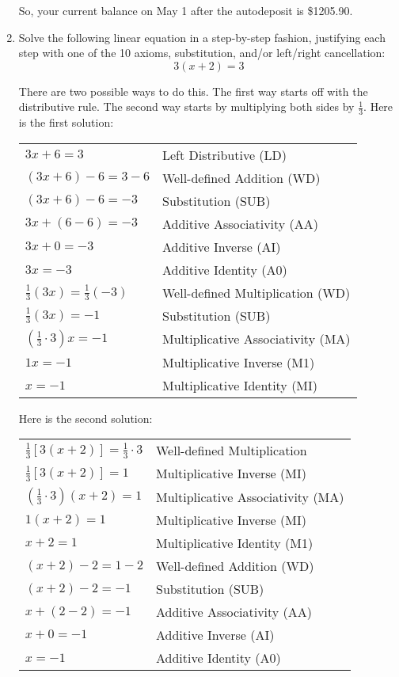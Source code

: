\documentclass[letterpaper,12pt,fleqn]{article}
\begin{document}
\begin{enumerate}
  So, your current balance on May 1 after the autodeposit is \$1205.90.

  \bigskip

\item Solve the following linear equation in a step-by-step fashion, justifying
  each step with one of the 10 axioms, substitution, and/or left/right
  cancellation:
  \[3(x+2)=3\]

  There are two possible ways to do this. The first way starts off with the
  distributive rule. The second way starts by multiplying both sides by
  $\frac{1}{3}$. Here is the first solution:

  \begin{tabular}{ll}
    $3x+6=3$ & Left Distributive (LD) \\
    $(3x+6)-6=3-6$ & Well-defined Addition (WD) \\
    $(3x+6)-6=-3$ & Substitution (SUB) \\
    $3x+(6-6)=-3$ & Additive Associativity (AA) \\
    $3x+0=-3$ & Additive Inverse (AI) \\
    $3x=-3$ & Additive Identity (A0) \\
    $\frac{1}{3}(3x)=\frac{1}{3}(-3)$ & Well-defined Multiplication (WD) \\
    $\frac{1}{3}(3x)=-1$ & Substitution (SUB) \\
    $\left(\frac{1}{3}\cdot3\right)x=-1$ & Multiplicative Associativity (MA) \\
    $1x=-1$ & Multiplicative Inverse (M1) \\
    $x=-1$ & Multiplicative Identity (MI) \\
  \end{tabular}

  Here is the second solution:
  
  \begin{tabular}{ll}
    $\frac{1}{3}[3(x+2)]=\frac{1}{3}\cdot3$ & Well-defined Multiplication \\
    $\frac{1}{3}[3(x+2)]=1$ & Multiplicative Inverse (MI) \\
    $\left(\frac{1}{3}\cdot3\right)(x+2)=1$ &
    Multiplicative Associativity (MA) \\
    $1(x+2)=1$ & Multiplicative Inverse (MI) \\
    $x+2=1$ & Multiplicative Identity (M1) \\
    $(x+2)-2=1-2$ & Well-defined Addition (WD) \\
    $(x+2)-2=-1$ & Substitution (SUB) \\
    $x+(2-2)=-1$ & Additive Associativity (AA) \\
    $x+0=-1$ & Additive Inverse (AI) \\
    $x=-1$ & Additive Identity (A0) \\
  \end{tabular}
\end{enumerate}
  
\end{document}
